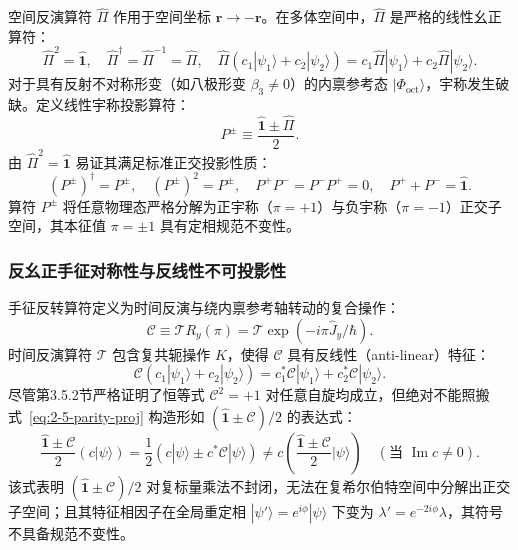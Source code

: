 空间反演算符 $\hat{\Pi}$ 作用于空间坐标 $\mathbf{r} \to -\mathbf{r}$。在多体空间中，$\hat{\Pi}$ 是严格的线性幺正算符：
\begin{equation}\label{eq:2-5-parity-unitary}
\hat{\Pi}^2 = \hat{\mathbf{1}}, \quad \hat{\Pi}^\dagger = \hat{\Pi}^{-1} = \hat{\Pi}, \quad \hat{\Pi}(c_1 |\psi_1\rangle + c_2 |\psi_2\rangle) = c_1 \hat{\Pi}|\psi_1\rangle + c_2 \hat{\Pi}|\psi_2\rangle.
\end{equation}
对于具有反射不对称形变（如八极形变 $\beta_3 \ne 0$）的内禀参考态 $|\Phi_{\text{oct}}\rangle$，宇称发生破缺。定义线性宇称投影算符：
\begin{equation}\label{eq:2-5-parity-proj}
P^\pm \equiv \frac{\hat{\mathbf{1}} \pm \hat{\Pi}}{2}.
\end{equation}
由 $\hat{\Pi}^2 = \hat{\mathbf{1}}$ 易证其满足标准正交投影性质：
\begin{equation}\label{eq:2-5-parity-projector-properties}
(P^\pm)^\dagger = P^\pm, \quad (P^\pm)^2 = P^\pm, \quad P^+ P^- = P^- P^+ = 0, \quad P^+ + P^- = \hat{\mathbf{1}}.
\end{equation}
算符 $P^\pm$ 将任意物理态严格分解为正宇称（$\pi = +1$）与负宇称（$\pi = -1$）正交子空间，其本征值 $\pi = \pm 1$ 具有定相规范不变性。

\subsubsection{反幺正手征对称性与反线性不可投影性}\label{sec:2-5-4-2}

手征反转算符定义为时间反演与绕内禀参考轴转动的复合操作：
\begin{equation}\label{eq:2-5-chiral-op-def}
\mathcal{C} \equiv \mathcal{T} R_y(\pi) = \mathcal{T} \exp(-i\pi \hat{J}_y / \hbar).
\end{equation}
时间反演算符 $\mathcal{T}$ 包含复共轭操作 $K$，使得 $\mathcal{C}$ 具有反线性（anti-linear）特征：
\begin{equation}\label{eq:2-5-C-anti-linear}
\mathcal{C} \left( c_1 |\psi_1\rangle + c_2 |\psi_2\rangle \right) = c_1^* \mathcal{C}|\psi_1\rangle + c_2^* \mathcal{C}|\psi_2\rangle.
\end{equation}
尽管第3.5.2节严格证明了恒等式 $\mathcal{C}^2 = +1$ 对任意自旋均成立，但绝对不能照搬式~\eqref{eq:2-5-parity-proj} 构造形如 $(\hat{\mathbf{1}} \pm \mathcal{C}) / 2$ 的表达式：
\begin{equation}\label{eq:2-5-non-linear-failure}
\frac{\hat{\mathbf{1}} \pm \mathcal{C}}{2} (c |\psi\rangle) = \frac{1}{2} \left( c |\psi\rangle \pm c^* \mathcal{C}|\psi\rangle \right) \ne c \left( \frac{\hat{\mathbf{1}} \pm \mathcal{C}}{2} |\psi\rangle \right) \quad (\text{当 } \operatorname{Im}c \ne 0).
\end{equation}
该式表明 $(\hat{\mathbf{1}} \pm \mathcal{C})/2$ 对复标量乘法不封闭，无法在复希尔伯特空间中分解出正交子空间；且其特征相因子在全局重定相 $|\psi'\rangle = e^{i\phi}|\psi\rangle$ 下变为 $\lambda' = e^{-2i\phi}\lambda$，其符号不具备规范不变性。

